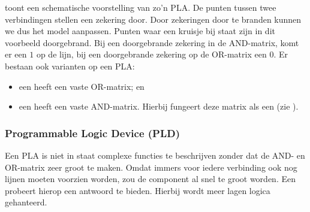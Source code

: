 toont een schematische voorstelling van zo'n PLA. De punten tussen twee verbindingen stellen een zekering door. Door zekeringen door te branden kunnen we dus het model aanpassen. Punten waar een kruisje bij staat zijn in dit voorbeeld doorgebrand. Bij een doorgebrande zekering in de AND-matrix, komt er een $1$ op de lijn, bij een doorgebrande zekering op de OR-matrix een $0$. Er bestaan ook varianten op een PLA:

\begin{itemize}
 \item een  heeft een vaste OR-matrix; en
 \item een  heeft een vaste AND-matrix. Hierbij fungeert deze matrix als een  (zie ).
\end{itemize}

\subsubsection{Programmable Logic Device (PLD)}
Een PLA is niet in staat complexe functies te beschrijven zonder dat de AND- en OR-matrix zeer groot te maken. Omdat immers voor iedere verbinding ook nog lijnen moeten voorzien worden, zou de component al snel te groot worden. Een  probeert hierop een antwoord te bieden. Hierbij wordt meer lagen logica gehanteerd. 

